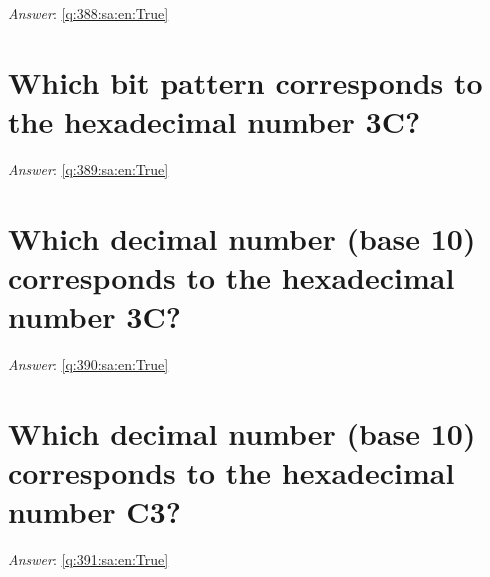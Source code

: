 \documentclass[a4paper,11pt,oneside]{book}
\begin{document}
\begin{sloppypar}
\vspace{2cm}

\noindent\makebox[\textwidth]{\hrulefill}

\vspace{1cm}

\textit{Answer}: \autoref{q:388:sa:en:True}



\section{Which bit pattern corresponds to the hexadecimal number 3C?}

\label{q:389:sa:en:False}

\vspace{2cm}

\noindent\makebox[\textwidth]{\hrulefill}

\vspace{1cm}

\textit{Answer}: \autoref{q:389:sa:en:True}



\section{Which decimal number (base 10) corresponds to the hexadecimal number 3C?}

\label{q:390:sa:en:False}

\vspace{2cm}

\noindent\makebox[\textwidth]{\hrulefill}

\vspace{1cm}

\textit{Answer}: \autoref{q:390:sa:en:True}



\section{Which decimal number (base 10) corresponds to the hexadecimal number C3?}

\label{q:391:sa:en:False}

\vspace{2cm}

\noindent\makebox[\textwidth]{\hrulefill}

\vspace{1cm}

\textit{Answer}: \autoref{q:391:sa:en:True}




\end{sloppypar}
\end{document}
